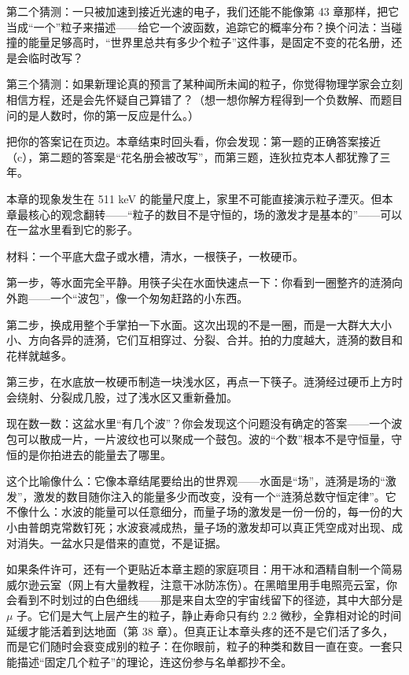 第二个猜测：一只被加速到接近光速的电子，我们还能不能像第 43 章那样，把它当成“一个”粒子来描述——给它一个波函数，追踪它的概率分布？换个问法：当碰撞的能量足够高时，“世界里总共有多少个粒子”这件事，是固定不变的花名册，还是会临时改写？

第三个猜测：如果新理论真的预言了某种闻所未闻的粒子，你觉得物理学家会立刻相信方程，还是会先怀疑自己算错了？（想一想你解方程得到一个负数解、而题目问的是人数时，你的第一反应是什么。）

把你的答案记在页边。本章结束时回头看，你会发现：第一题的正确答案接近（c），第二题的答案是“花名册会被改写”，而第三题，连狄拉克本人都犹豫了三年。


本章的现象发生在 511 keV 的能量尺度上，家里不可能直接演示粒子湮灭。但本章最核心的观念翻转——“粒子的数目不是守恒的，场的激发才是基本的”——可以在一盆水里看到它的影子。

\begin{experiment}
材料：一个平底大盘子或水槽，清水，一根筷子，一枚硬币。

第一步，等水面完全平静。用筷子尖在水面快速点一下：你看到一圈整齐的涟漪向外跑——一个“波包”，像一个匆匆赶路的小东西。

第二步，换成用整个手掌拍一下水面。这次出现的不是一圈，而是一大群大大小小、方向各异的涟漪，它们互相穿过、分裂、合并。拍的力度越大，涟漪的数目和花样就越多。

第三步，在水底放一枚硬币制造一块浅水区，再点一下筷子。涟漪经过硬币上方时会绕射、分裂成几股，过了浅水区又重新叠加。

现在数一数：这盆水里“有几个波”？你会发现这个问题没有确定的答案——一个波包可以散成一片，一片波纹也可以聚成一个鼓包。波的“个数”根本不是守恒量，守恒的是你拍进去的能量去了哪里。
\end{experiment}

这个比喻像什么：它像本章结尾要给出的世界观——水面是“场”，涟漪是场的“激发”，激发的数目随你注入的能量多少而改变，没有一个“涟漪总数守恒定律”。它不像什么：水波的能量可以任意细分，而量子场的激发是一份一份的，每一份的大小由普朗克常数钉死；水波衰减成热，量子场的激发却可以真正凭空成对出现、成对消失。一盆水只是借来的直觉，不是证据。

如果条件许可，还有一个更贴近本章主题的家庭项目：用干冰和酒精自制一个简易威尔逊云室（网上有大量教程，注意干冰防冻伤）。在黑暗里用手电照亮云室，你会看到不时划过的白色细线——那是来自太空的宇宙线留下的径迹，其中大部分是 \(\mu\) 子。它们是大气上层产生的粒子，静止寿命只有约 2.2 微秒，全靠相对论的时间延缓才能活着到达地面（第 38 章）。但真正让本章头疼的还不是它们活了多久，而是它们随时会衰变成别的粒子：在你眼前，粒子的种类和数目一直在变。一套只能描述“固定几个粒子”的理论，连这份参与名单都抄不全。


